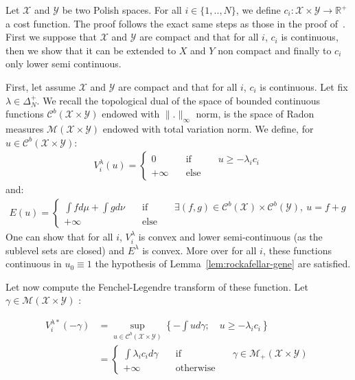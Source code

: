 \begin{prv*}
Let $\mathcal{X}$ and $\mathcal{Y}$ be two Polish spaces. For all $i\in \{1,..,N\}$, we define $c_i:\mathcal{X}\times\mathcal{Y}\rightarrow \mathbb{R}^+$ a cost function. The proof follows the exact same steps as those in the proof of~\citep[Theorem 1.3]{villani2003topics}. First we suppose that $\mathcal{X}$ and $\mathcal{Y}$ are compact and that for all $i$, $c_i$ is continuous, then we show that it can be extended to $X$ and $Y$ non compact and finally to $c_i$ only lower semi continuous.

\medskip
First, let assume $\mathcal{X}$ and $\mathcal{Y}$ are compact and that for all $i$, $c_i$ is continuous. Let fix $\lambda \in\Delta^+_N$. We recall the topological dual of the space of bounded continuous functions $\mathcal{C}^b(\mathcal{X}\times\mathcal{Y})$ endowed with $\lVert.\rVert_\infty$ norm, is the space of Radon measures $\mathcal{M}(\mathcal{X}\times\mathcal{Y})$ endowed with total variation norm. We define, for $u\in \mathcal{C}^b(\mathcal{X}\times\mathcal{Y})$:
\begin{align*}
V^\lambda_i(u) =
\left\{\begin{matrix} 0 &\quad\text{if}\quad& u\geq -\lambda_i c_i\\
+\infty &\quad\text{else}\quad&\end{matrix}\right.
\end{align*}
and:
\begin{align*}
E(u)=\left\{\begin{matrix} \int fd\mu+\int gd\nu &\quad\text{if}\quad& \exists (f,g)\in \mathcal{C}^b(\mathcal{X})\times \mathcal{C}^b(\mathcal{Y}),~ u = f+g\\
+\infty &\quad\text{else}\quad&\end{matrix}\right.
\end{align*}
One can show that for all $i$, $V^\lambda_i$ is convex and lower semi-continuous (as the sublevel sets are closed) and $E^\lambda$ is convex. More over for all $i$, these functions continuous in $u_0\equiv 1$ the hypothesis of Lemma~\ref{lem:rockafellar-gene} are satisfied.


Let now compute the Fenchel-Legendre transform of these function.  Let $\gamma\in \mathcal{M}(\mathcal{X}\times\mathcal{Y})$ :

\begin{align*}
V^{\lambda*}_i(-\gamma) &= \sup_{u\in \mathcal{C}^b(\mathcal{X}\times\mathcal{Y})}\left\{-\int ud\gamma;\quad u\geq-\lambda_i c_i\right\}
\\
& = \left\{\begin{matrix}\int \lambda_i c_i d\gamma &\quad\text{if} \quad& \gamma\in\mathcal{M}_+(\mathcal{X}\times\mathcal{Y}) \\
+\infty &\quad\text{otherwise}\quad& \end{matrix}\right.
\end{align*}


\end{prv*}
